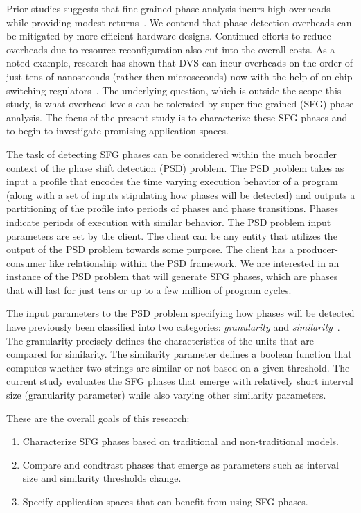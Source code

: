 Prior studies suggests that fine-grained phase analysis incurs high overheads while providing modest returns~\cite{Magklis:2003:PDV}\cite{Huang:2003:PAP}. We contend that phase detection overheads can be mitigated by more efficient hardware designs. Continued efforts to reduce overheads due to resource reconfiguration also cut into the overall costs. As a noted example, research has shown that DVS  can incur overheads on the order of just tens of nanoseconds (rather then microseconds) now with the help of on-chip switching regulators~\cite{Kim:2011:FLD}\cite{Kim:2008:HPC}. The underlying question, which is outside the scope this study, is what overhead levels can be tolerated by super fine-grained (SFG) phase analysis. The focus of the present study is to characterize these SFG phases and to begin to investigate promising application spaces. 

The task of detecting SFG phases can be considered within the much broader context of the phase shift detection (PSD) problem. The PSD problem takes as input a profile that encodes the time varying execution behavior of a program (along with a set of inputs stipulating how phases will be detected) and outputs a partitioning of the profile into periods of phases and phase transitions. Phases indicate periods of execution with similar behavior. The PSD problem input parameters are set by the client. The client can be any entity that utilizes the output of the PSD problem towards some purpose. The client has a producer-consumer like relationship within the PSD framework. We are interested in an instance of the PSD problem that will generate SFG phases, which are phases that will last for just tens or up to a few million of program cycles.

The input parameters to the PSD problem specifying how phases will be detected have previously been classified into two categories: \emph{granularity} and \emph{similarity}~\cite{Hind03phaseshift}. The granularity precisely defines the characteristics of the units that are compared for similarity. The similarity parameter defines a boolean function that computes whether two strings are similar or not based on a given threshold. The current study evaluates the SFG phases that emerge with relatively short interval size (granularity parameter) while also varying other similarity parameters. 

These are the overall goals of this research: 

\begin{enumerate}
\item Characterize SFG phases based on traditional and non-traditional models.
\item Compare and condtrast phases that emerge as parameters such as interval size and similarity thresholds change.
\item Specify application spaces that can benefit from using SFG phases.
\end{enumerate}



